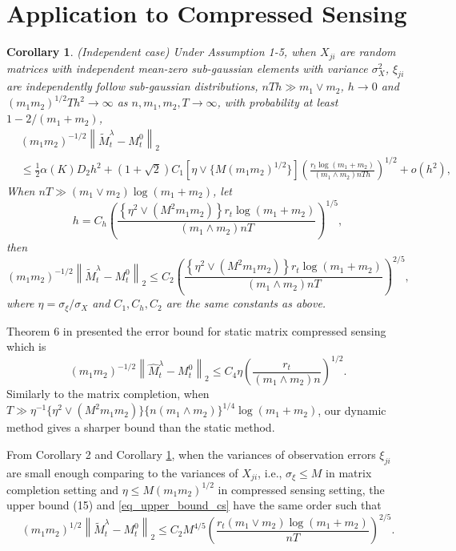 \documentclass[12pt]{article}
\newtheorem{cor}{Corollary}
\begin{document}
\section{Application to Compressed Sensing}
  \begin{cor}
  \label{cor_compress_sensing}(Independent case)
  Under Assumption 1-5, when $X_{ji}$ are random matrices with independent mean-zero sub-gaussian elements with variance $\sigma_X^2$, $\xi_{ji}$ are independently follow sub-gaussian distributions, $nTh\gg m_1\vee m_2$, $h\rightarrow0$ and $(m_1m_2)^{1/2}Th^2\rightarrow\infty$ as $n,m_1,m_2,T\rightarrow\infty$, with probability at least $1-2/(m_1+m_2)$,
  {\small\begin{align*}     
 & (m_1m_2)^{-1/2}\left\|\widetilde{M}_t^\lambda - M_t^0\right\|_2 \\&\le \frac{1}{2}\alpha(K)D_2h^2 +\left(1+\sqrt{2}\right)C_1\left[\eta\vee \{M (m_1 m_2)^{1/2}\}\right]\left(\frac{r_t\log(m_1+m_2)}{(m_1\wedge m_2)n Th}\right)^{1/2}+o(h^2),
  \end{align*}}
  When $nT\gg(m_1\vee m_2)\log(m_1+m_2)$, let 
  \begin{equation*}
    h = C_h\left(\frac{\left\{\eta^2 \vee(M^2 m_1 m_2)\right\}r_t\log(m_1+m_2)}{(m_1\wedge m_2)n T}\right)^{1/5},
  \end{equation*}
  then 
  \begin{equation}\label{eq_upper_bound_cs}
     (m_1m_2)^{-1/2}\left\|\widetilde{M}_t^\lambda - M_t^0\right\|_2 \le C_2 \left(\frac{\left\{\eta^2 \vee(M^2 m_1 m_2)\right\}r_t\log(m_1+m_2)}{(m_1\wedge m_2)n T}\right)^{2/5},
  \end{equation}
  where $\eta = \sigma_\xi/\sigma_X$ and $C_1,C_h,C_2$ are the same constants as above.
  \end{cor}
  
  Theorem 6 in \cite{koltchinskii2011neumann} presented the error bound for static matrix compressed sensing which is
  \begin{equation*}
      (m_1m_2)^{-1/2}\left\|\widehat{M}_t^\lambda - M_t^0\right\|_2\le C_4\eta\left(\frac{ r_t}{(m_1\wedge m_2)n}\right)^{1/2}.
  \end{equation*}
  Similarly to the matrix completion, when $T\gg\eta^{-1}\{\eta^2 \vee(M^2 m_1 m_2)\}\{n(m_1\wedge m_2)\}^{1/4}\log(m_1+m_2)$, our dynamic method gives a sharper bound than the static method. 
  
  From Corollary 2 and Corollary \ref{cor_compress_sensing}, when the variances of observation errors $\xi_{ji}$ are small enough comparing to the variances of $X_{ji}$, i.e., $\sigma_\xi\le M$ in matrix completion setting and $\eta \le M(m_1m_2)^{1/2}$ in compressed sensing setting, the upper bound (15) and \eqref{eq_upper_bound_cs} have the same order such that
  \begin{equation*}
     (m_1m_2)^{1/2}\left\|\widetilde{M}_t^\lambda - M_t^0\right\|_2 \le C_2 M^{4/5}\left(\frac{r_t(m_1\vee m_2)\log(m_1+m_2)}{n T}\right)^{2/5}.
  \end{equation*}
\end{document}
